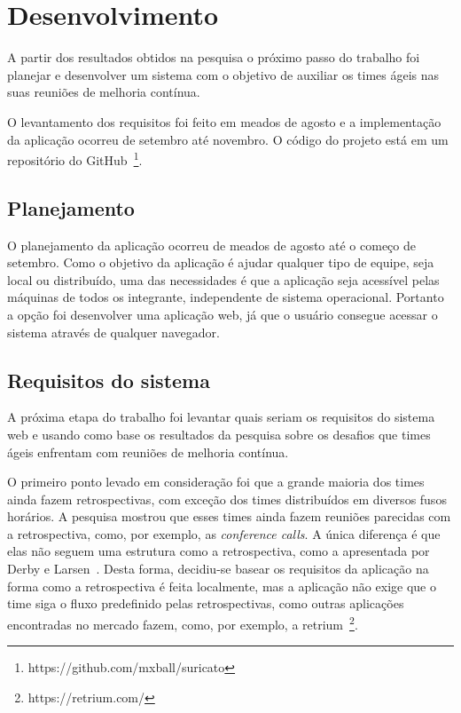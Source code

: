 \section{Desenvolvimento}

A partir dos resultados obtidos na pesquisa o próximo passo do trabalho foi  planejar e desenvolver um sistema com o objetivo de auxiliar os times ágeis nas suas reuniões de melhoria contínua.

O levantamento dos requisitos foi feito em meados de agosto e a implementação da aplicação ocorreu de setembro até novembro. O código do projeto está em um repositório do GitHub~\footnote{https://github.com/mxball/suricato}.

\subsection{Planejamento}

O planejamento da aplicação ocorreu de meados de agosto até o começo de setembro. Como o objetivo da aplicação é ajudar qualquer tipo de equipe, seja local ou distribuído, uma das necessidades é que a aplicação seja acessível pelas máquinas de todos os integrante, independente de sistema operacional. Portanto a opção foi desenvolver uma aplicação web, já que o usuário consegue acessar o sistema através de qualquer navegador.

\subsection{Requisitos do sistema}

A próxima etapa do trabalho foi levantar quais seriam os requisitos do sistema web e usando como base os resultados da pesquisa sobre os desafios que times ágeis enfrentam com reuniões de melhoria contínua.

O primeiro ponto levado em consideração foi que a grande maioria dos times ainda fazem retrospectivas, com exceção dos times distribuídos em diversos fusos horários. A pesquisa mostrou que esses times ainda fazem reuniões parecidas com a retrospectiva, como, por exemplo, as \textit{conference calls}. A única diferença é que elas não seguem uma estrutura como a retrospectiva, como a apresentada por Derby e Larsen~\cite{retrospectives}. Desta forma, decidiu-se basear os requisitos da aplicação na forma como a retrospectiva é feita localmente, mas a aplicação não exige que o time siga o fluxo predefinido pelas retrospectivas, como outras aplicações encontradas no mercado fazem, como, por exemplo, a retrium~\footnote{https://retrium.com/}.

